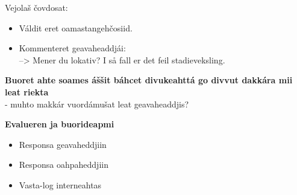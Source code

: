 \documentclass[landscape,norsk,11pt]{seminar}
\begin{document}
\begin{slide}
Vejolaš čovdosat:
\begin{itemize}
\item Váldit eret oamastangehčosiid.
\item Kommenteret geavaheaddjái: \\
--> Mener du lokativ? I så fall er det feil stadieveksling.
\end{itemize}


\newslide
\textbf{Buoret ahte soames áššit báhcet divukeahttá go divvut dakkára mii leat riekta} \\
- muhto makkár vuordámušat leat geavaheaddjis?

\newslide
\textbf{Evalueren ja buorideapmi}
\begin{itemize}
\item{Responsa geavaheddjiin}
\item{Responsa oahpaheddjiin}
\item{Vasta-log interneahtas}
\end{itemize}


\end{slide}
\end{document}

